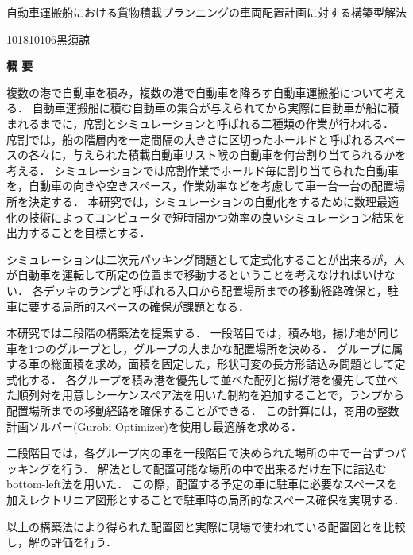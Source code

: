 \begin{center}
{\LARGE 自動車運搬船における貨物積載プランニングの車両配置計画に対する構築型解法}\\[0.5cm]
\end{center}
\hfill
{\large 101810106\qquad 黒須諒}\\[0.5cm]
\begin{center}
{\Large \bf 概 要}\\
\end{center}

複数の港で自動車を積み，複数の港で自動車を降ろす自動車運搬船について考える．
自動車運搬船に積む自動車の集合が与えられてから実際に自動車が船に積まれるまでに，席割とシミュレーションと呼ばれる二種類の作業が行われる．
席割では，船の階層内を一定間隔の大きさに区切ったホールドと呼ばれるスペースの各々に，与えられた積載自動車リスト喉の自動車を何台割り当てられるかを考える．
シミュレーションでは席割作業でホールド毎に割り当てられた自動車を，自動車の向きや空きスペース，作業効率などを考慮して車一台一台の配置場所を決定する．
本研究では，シミュレーションの自動化をするために数理最適化の技術によってコンピュータで短時間かつ効率の良いシミュレーション結果を出力することを目標とする．

シミュレーションは二次元パッキング問題として定式化することが出来るが，人が自動車を運転して所定の位置まで移動するということを考えなければいけない．
各デッキのランプと呼ばれる入口から配置場所までの移動経路確保と，駐車に要する局所的スペースの確保が課題となる．

本研究では二段階の構築法を提案する．
一段階目では，積み地，揚げ地が同じ車を1つのグループとし，グループの大まかな配置場所を決める．
グループに属する車の総面積を求め，面積を固定した，形状可変の長方形詰込み問題として定式化する．
各グループを積み港を優先して並べた配列と揚げ港を優先して並べた順列対を用意しシーケンスペア法を用いた制約を追加することで，ランプから配置場所までの移動経路を確保することができる．
この計算には，商用の整数計画ソルバー(Gurobi Optimizer)を使用し最適解を求める．

二段階目では，各グループ内の車を一段階目で決められた場所の中で一台ずつパッキングを行う．
解法として配置可能な場所の中で出来るだけ左下に詰込むbottom-left法を用いた．
この際，配置する予定の車に駐車に必要なスペースを加えレクトリニア図形とすることで駐車時の局所的なスペース確保を実現する．

以上の構築法により得られた配置図と実際に現場で使われている配置図とを比較し，解の評価を行う．